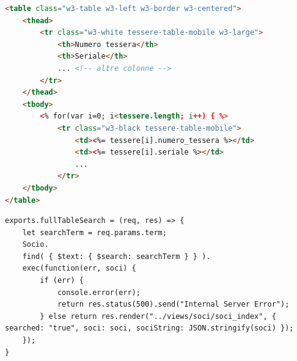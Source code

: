 \documentclass[12pt]{report}
\begin{document}
\begin{itemize}
\begin{lstlisting}[language=HTML, morekeywords={if, else}, caption={Parte del codice HTML della vista creata per presentare le tessere all'utente}, label={lst:view}, xleftmargin=\dimexpr-\leftmargini]
<table class="w3-table w3-left w3-border w3-centered">
	<thead>
		<tr class="w3-white tessere-table-mobile w3-large">
			<th>Numero tessera</th>
			<th>Seriale</th>
			... <!-- altre colonne -->
		</tr>
	</thead>
	<tbody>
		<% for(var i=0; i<tessere.length; i++) { %>
			<tr class="w3-black tessere-table-mobile">
				<td><%= tessere[i].numero_tessera %></td>
				<td><%= tessere[i].seriale %></td>
				...
			</tr>
	</tbody>
</table>
\end{lstlisting}
\begin{lstlisting}[caption={Parte del codice del controller creato per gestire i comandi relativi ai soci.  Questa funzione, quando viene chiamata, cerca nel database i soci in base al termine inviato tra i parametri e poi carica una pagina con i risultati.}, label={lst:controller}, xleftmargin=\dimexpr-\leftmargini]
exports.fullTableSearch = (req, res) => {
	let searchTerm = req.params.term;
	Socio.
	find( { $text: { $search: searchTerm } } ).
	exec(function(err, soci) {
		if (err) {
			console.error(err);
			return res.status(500).send("Internal Server Error");
		} else return res.render("../views/soci/soci_index", { searched: "true", soci: soci, sociString: JSON.stringify(soci) });
	});
}
\end{lstlisting}
	 
\end{itemize}
\end{document}
